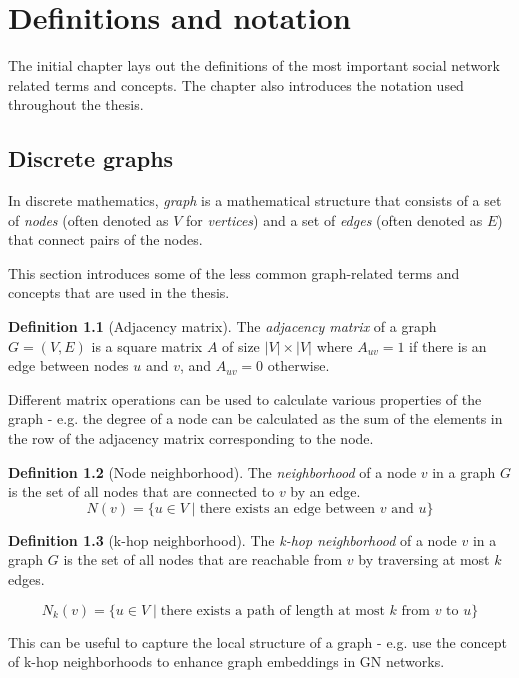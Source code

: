 \chapter{Definitions and notation}

The initial chapter lays out the definitions of the most important social network related terms and concepts. 
The chapter also introduces the notation used throughout the thesis.

\section{Discrete graphs}

In discrete mathematics, \textit{graph} is a mathematical structure that consists of a set of \textit{nodes} (often denoted as $V$ for \textit{vertices})
and a set of \textit{edges} (often denoted as $E$) that connect pairs of the nodes.

This section introduces some of the less common graph-related terms and concepts that are used in the thesis.

\theoremstyle{definition}
\newtheorem{definition}{Definition}[section]

\begin{definition}[Adjacency matrix]
    The \textit{adjacency matrix} of a graph $G = (V, E)$ is a square matrix $A$ of size $|V| \times |V|$ where $A_{uv} = 1$ if there is an edge between nodes $u$ and $v$, and $A_{uv} = 0$ otherwise.  

    Different matrix operations can be used to calculate various properties of the graph - e.g. the degree of a node can be calculated as the sum of the elements in the row of the adjacency matrix corresponding to the node.
\end{definition}

\begin{definition}[Node neighborhood]
    The \textit{neighborhood} of a node $v$ in a graph $G$ is the set of all nodes that are connected to $v$ by an edge.
    $$
    N(v) = \{ u \in V \mid \text{there exists an edge between $v$ and $u$} \}
    $$
\end{definition}

\begin{definition}[k-hop neighborhood]
    The \textit{k-hop neighborhood} of a node $v$ in a graph $G$ is the set of all nodes that are reachable from $v$ by traversing at most $k$ edges.

    $$
    N_k(v) = \{ u \in V \mid \text{there exists a path of length at most $k$ from $v$ to $u$} \}
    $$

    This can be useful to capture the local structure of a graph 
    - e.g. \cite{nikolentzos2019khop} use the concept of k-hop neighborhoods to enhance graph embeddings in GN networks.
\end{definition}

